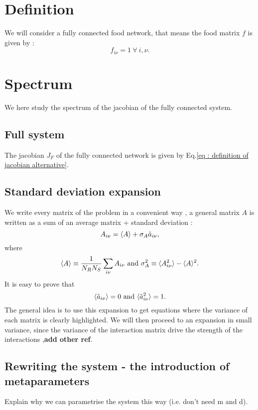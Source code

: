 \documentclass[12pt, titlepage]{report}
\begin{document}
	\section{Definition}
	We will consider a fully connected food network, that means the food matrix $f$ is given by :
	\begin{equation}
	f_{i\nu} = 1 \ \forall \ i, \nu.
	\end{equation}
	\section{Spectrum}
	We here study the spectrum of the jacobian of the fully connected system.
	\subsection{Full system}
	The jacobian $J_F$ of the fully connected network is given by Eq.\eqref{eq : definition of jacobian alternative}.

	\subsection{Standard deviation expansion}
	We write every matrix of the problem in a convenient way \cite{barbier_cavity_2017},  \ie a general matrix $A$ is written as a sum of an average matrix + standard deviation :
	 \begin{equation}
	 A_{i\nu} = \langle A \rangle + \sigma_A \tilde{a}_{i\nu}, \label{eq : separation matrix average standard dev}
	 \end{equation}
	 where
	 \begin{equation}
	 \langle A \rangle\equiv \frac{1}{N_R N_S} \sum_{i\nu} A_{i\nu} \text{ and } \sigma_A^2 \equiv \langle A_{i\nu}^2 \rangle-\langle A \rangle^2.
	 \end{equation}
	 It is easy to prove that
	 \begin{equation}
	 \langle \tilde{a}_{i\nu} \rangle = 0 \text{ and } \langle \tilde{a}_{i\nu}^2 \rangle = 1.
	 \end{equation}
	 The general idea is to use this expansion to get equations where the variance of each matrix is clearly highlighted. We will then proceed to an expansion in small variance, since the variance of the interaction matrix drive the strength of the interactions \cite{barbier_cavity_2017},\textbf{add other ref}.
	 \subsection{Rewriting the system - the introduction of metaparameters}
	 Explain why we can parametrise the system this way (i.e. don't need m and d).
\end{document}
